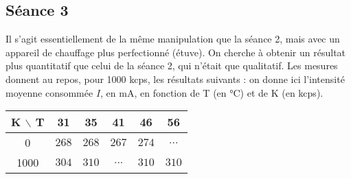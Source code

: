 \documentclass[french]{article}
\newcommand{\bs}{\xspace$\backslash$\xspace}
\begin{document}
\subsection{Séance 3}

Il s'agit essentiellement de la même manipulation que la séance 2, mais avec un appareil de chauffage plus perfectionné (étuve). On cherche à obtenir un résultat plus quantitatif que celui de la séance 2, qui n'était que qualitatif. Les mesures donnent au repos, pour 1000 kcps, les résultats suivants : on donne ici l'intensité moyenne consommée $I$, en mA, en fonction de T (en °C) et de K (en kcps).

\begin{table}[ht]
    \centering
    \begin{tabular}{|c|c|c|c|c|c|} \hline
    \textbf{K \bs T } &   31  &   35  &   41  &   46  &   56  \\ \hline
            0         &$ 268 $&$ 268 $&$ 267 $&$ 274 $&$ ... $\\ \hline
            1000      &$ 304 $&$ 310 $&$ ... $&$ 310 $&$ 310 $\\ \hline
    \end{tabular}
\end{table}
\end{document}
